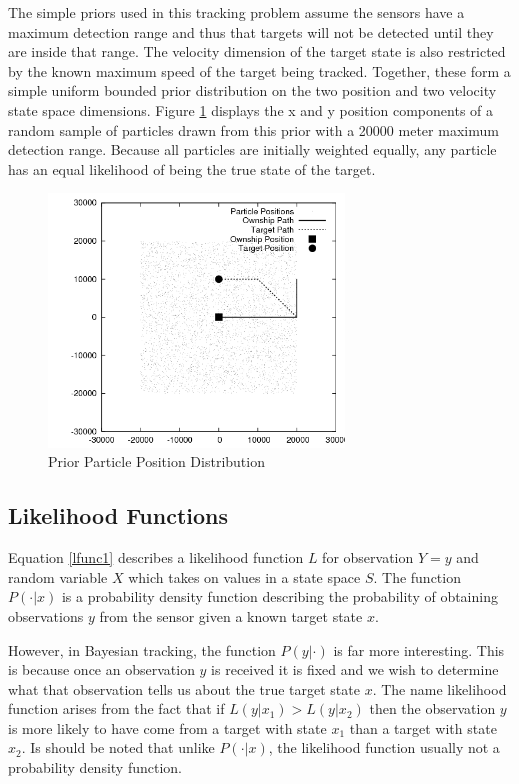\documentclass{article}
\begin{document}
The simple priors used in this tracking problem assume the sensors have a maximum detection range and thus that targets will not be detected until they are inside that range. The velocity dimension of the target state is also restricted by the known maximum speed of the target being tracked. Together, these form a simple uniform bounded prior distribution on the two position and two velocity state space dimensions. Figure \ref{prior} displays the x and y position components of a random sample of particles drawn from this prior with a 20000 meter maximum detection range. Because all particles are initially weighted equally, any particle has an equal likelihood of being the true state of the target.

\begin{figure}
\centering
\includegraphics[width=0.7\textwidth]{data/particles_prior.png}
\caption{Prior Particle Position Distribution}
\label{prior}
\end{figure}

\subsection{Likelihood Functions}
Equation \ref{lfunc1} describes a likelihood function \(L\) for observation \(Y=y\) and random variable \(X\) which takes on values in a state space \(S\). The function \(P(\cdot|x)\) is a probability density function describing the probability of obtaining observations \(y\) from the sensor given a known target state \(x\).

However, in Bayesian tracking, the function \(P(y|\cdot)\) is far more interesting. This is because once an observation \(y\) is received it is fixed and we wish to determine what that observation tells us about the true target state \(x\). The name likelihood function arises from the fact that if \(L(y|x_{1})>L(y|x_{2})\) then the observation \(y\) is more likely to have come from a target with state \(x_{1}\) than a target with state \(x_{2}\). Is should be noted that unlike \(P(\cdot|x)\), the likelihood function usually not a probability density function.\cite{bmtt}
\end{document}
